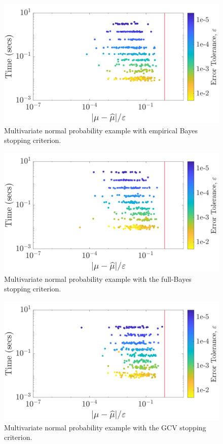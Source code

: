 \documentclass[graybox,footinfo]{svmult}
\begin{document}
\begin{figure}
\centering
\includegraphics[width=0.95\linewidth]{"figures/Sobol/Sobol_MVN_guaranteed_time_MLE__d2_r1_2019-Sep-1"}
\caption[Sobol: MVN guaranteed: MLE]{Multivariate normal probability example with empirical Bayes stopping criterion.}
\label{FJ:fig:Sobol-mvn-guaranteed-MLE}
\end{figure}
\begin{figure}
\centering
\includegraphics[width=0.95\linewidth]{"figures/Sobol/Sobol_MVN_guaranteed_time_full__d2_r1_2019-Sep-1"}
\caption[Sobol: MVN guaranteed: Full Bayes]{Multivariate normal probability example with the full-Bayes stopping criterion.}
\label{FJ:fig:Sobol-mvn-guaranteed-FB}
\end{figure}
\begin{figure}
\centering
\includegraphics[width=0.95\linewidth]{"figures/Sobol/Sobol_MVN_guaranteed_time_GCV__d2_r1_2019-Sep-1"}
\caption[Sobol: MVN guaranteed: GCV]{Multivariate normal probability example with the GCV stopping criterion.}
\label{FJ:fig:Sobol-mvn-guaranteed-GCV}
\end{figure}
\end{document}
